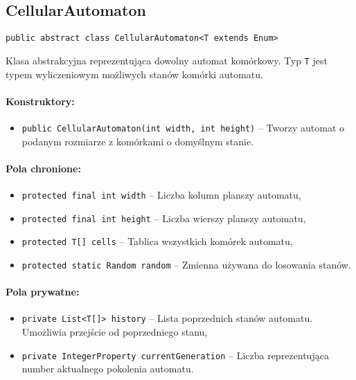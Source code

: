 \documentclass{report}
\begin{document}
\subsection{CellularAutomaton} \label{subsec:cellularAutomaton}
\texttt{public abstract class CellularAutomaton<T extends Enum>}

Klasa abstrakcyjna reprezentująca dowolny automat komórkowy.
Typ \texttt{T} jest typem wyliczeniowym możliwych stanów komórki automatu.

\paragraph{Konstruktory:}
\begin{itemize}
	\item \texttt{public CellularAutomaton(int width, int height)} -- Tworzy automat o podanym rozmiarze z komórkami o domyślnym stanie.
\end{itemize}

\paragraph{Pola chronione:}
\begin{itemize}
	\item \texttt{protected final int width} -- Liczba kolumn planszy automatu,
	\item \texttt{protected final int height} -- Liczba wierszy planszy automatu,
	\item \texttt{protected T[] cells} -- Tablica wszystkich komórek automatu,
	\item \texttt{protected static Random random} -- Zmienna używana do losowania stanów.
\end{itemize}

\paragraph{Pola prywatne:}
\begin{itemize}
	\item \texttt{private List<T[]> history} -- Lista poprzednich stanów automatu. \\ Umożliwia przejście od poprzedniego stanu,
	\item \texttt{private IntegerProperty currentGeneration} -- Liczba reprezentująca number aktualnego pokolenia automatu.
\end{itemize}
\end{document}
